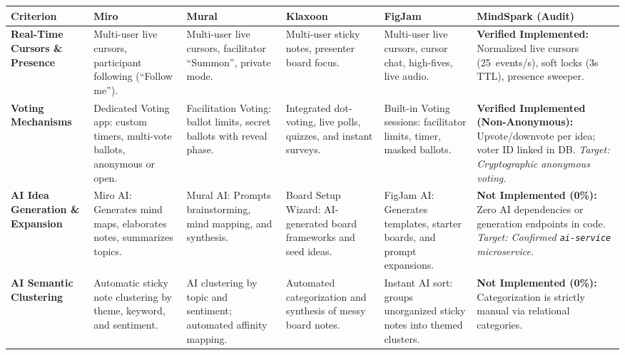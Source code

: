 \begin{table}[htbp]
\centering
\footnotesize
\setlength{\tabcolsep}{4pt}
\renewcommand{\arraystretch}{1.35}
\begin{tabularx}{\textwidth}{
  >{\RaggedRight\arraybackslash}p{2.1cm}
  *{4}{>{\RaggedRight\arraybackslash}X}
  >{\RaggedRight\arraybackslash}p{3.6cm}
}
\toprule
\rowcolor{PrimaryNavy!12}
\textbf{Criterion} & \textbf{Miro}~\cite{miro_pricing} & \textbf{Mural}~\cite{mural_pricing} & \textbf{Klaxoon}~\cite{klaxoon_pricing} & \textbf{FigJam}~\cite{figjam_pricing} & \textbf{MindSpark (Audit)} \\
\midrule
\textbf{Real-Time Cursors \& Presence} & 
Multi-user live cursors, participant following (``Follow me''). & 
Multi-user live cursors, facilitator ``Summon'', private mode. & 
Multi-user sticky notes, presenter board focus. & 
Multi-user live cursors, cursor chat, high-fives, live audio. & 
\textbf{Verified Implemented:} Normalized live cursors (25~events/s), soft locks (3s TTL), presence sweeper. \\
\addlinespace[4pt]
\textbf{Voting Mechanisms} & 
Dedicated Voting app: custom timers, multi-vote ballots, anonymous or open. & 
Facilitation Voting: ballot limits, secret ballots with reveal phase. & 
Integrated dot-voting, live polls, quizzes, and instant surveys. & 
Built-in Voting sessions: facilitator limits, timer, masked ballots. & 
\textbf{Verified Implemented (Non-Anonymous):} Upvote/downvote per idea; voter ID linked in DB. \textit{Target: Cryptographic anonymous voting.} \\
\addlinespace[4pt]
\textbf{AI Idea Generation \& Expansion} & 
Miro AI: Generates mind maps, elaborates notes, summarizes topics. & 
Mural AI: Prompts brainstorming, mind mapping, and synthesis. & 
Board Setup Wizard: AI-generated board frameworks and seed ideas. & 
FigJam AI: Generates templates, starter boards, and prompt expansions. & 
\textbf{Not Implemented (0\%):} Zero AI dependencies or generation endpoints in code. \textit{Target: Confirmed \texttt{ai-service} microservice.} \\
\addlinespace[4pt]
\textbf{AI Semantic Clustering} & 
Automatic sticky note clustering by theme, keyword, and sentiment. & 
AI clustering by topic and sentiment; automated affinity mapping. & 
Automated categorization and synthesis of messy board notes. & 
Instant AI sort: groups unorganized sticky notes into themed clusters. & 
\textbf{Not Implemented (0\%):} Categorization is strictly manual via relational categories. \\

\end{tabularx}
\end{table}
